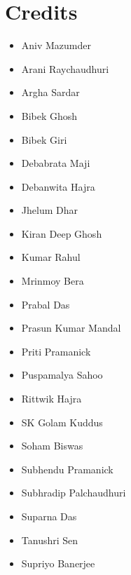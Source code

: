 \chapter*{Credits}
\thispagestyle{empty}

\begin{multicols}{2} %
\begin{itemize}
  \item Aniv Mazumder 
  \item Arani Raychaudhuri 
  \item Argha Sardar
  \item Bibek Ghosh
  \item Bibek Giri
  \item Debabrata Maji 
  \item Debanwita Hajra
  \item Jhelum Dhar
  \item Kiran Deep Ghosh
  \item Kumar Rahul
  \item Mrinmoy Bera
  \item Prabal Das
  \item Prasun Kumar Mandal 
  \item Priti Pramanick
  \item Puspamalya Sahoo 
  \item Rittwik Hajra
  \item SK Golam Kuddus
  \item Soham Biswas
  \item Subhendu Pramanick
  \item Subhradip Palchaudhuri 
  \item Suparna Das
  \item Tanushri Sen
  \item Supriyo Banerjee
\end{itemize}
\end{multicols}


